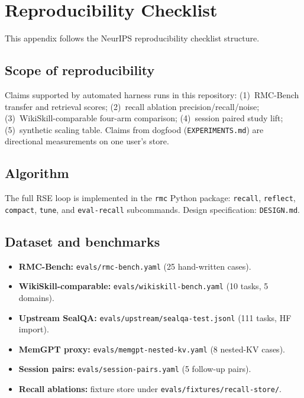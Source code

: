 \section{Reproducibility Checklist}
\label{app:repro}

This appendix follows the NeurIPS reproducibility checklist structure.

\subsection{Scope of reproducibility}

Claims supported by automated harness runs in this repository:
(1)~RMC-Bench transfer and retrieval scores;
(2)~recall ablation precision/recall/noise;
(3)~WikiSkill-comparable four-arm comparison;
(4)~session paired study lift;
(5)~synthetic scaling table.
Claims from dogfood (\texttt{EXPERIMENTS.md}) are directional measurements on one user's store.

\subsection{Algorithm}

The full RSE loop is implemented in the \texttt{rmc} Python package:
\texttt{recall}, \texttt{reflect}, \texttt{compact}, \texttt{tune}, and \texttt{eval-recall} subcommands.
Design specification: \texttt{DESIGN.md}.

\subsection{Dataset and benchmarks}

\begin{itemize}
  \item \textbf{RMC-Bench:} \texttt{evals/rmc-bench.yaml} (25 hand-written cases).
  \item \textbf{WikiSkill-comparable:} \texttt{evals/wikiskill-bench.yaml} (10 tasks, 5 domains).
  \item \textbf{Upstream SealQA:} \texttt{evals/upstream/sealqa-test.jsonl} (111 tasks, HF import).
  \item \textbf{MemGPT proxy:} \texttt{evals/memgpt-nested-kv.yaml} (8 nested-KV cases).
  \item \textbf{Session pairs:} \texttt{evals/session-pairs.yaml} (5 follow-up pairs).
  \item \textbf{Recall ablations:} fixture store under \texttt{evals/fixtures/recall-store/}.
\end{itemize}

